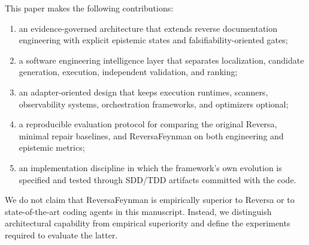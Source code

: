 This paper makes the following contributions:

\begin{enumerate}
  \item an evidence-governed architecture that extends reverse documentation engineering with explicit epistemic states and falsifiability-oriented gates;
  \item a software engineering intelligence layer that separates localization, candidate generation, execution, independent validation, and ranking;
  \item an adapter-oriented design that keeps execution runtimes, scanners, observability systems, orchestration frameworks, and optimizers optional;
  \item a reproducible evaluation protocol for comparing the original Reversa, minimal repair baselines, and ReversaFeynman on both engineering and epistemic metrics;
  \item an implementation discipline in which the framework's own evolution is specified and tested through SDD/TDD artifacts committed with the code.
\end{enumerate}

We do not claim that ReversaFeynman is empirically superior to Reversa or to state-of-the-art coding agents in this manuscript. Instead, we distinguish architectural capability from empirical superiority and define the experiments required to evaluate the latter.